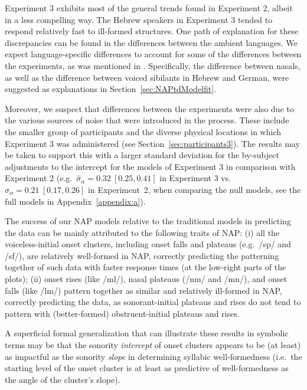 Experiment 3 exhibits most of the general trends found in Experiment 2, albeit in a less compelling way. 
The Hebrew speakers in Experiment 3 tended to respond relatively fast to ill-formed structures.
One path of explanation for these discrepancies can be found in the differences between the ambient languages. We expect language-specific differences to account for some of the differences between the experiments, as was mentioned in . Specifically, the difference between nasals, as well as the difference between voiced sibilants in Hebrew and German, were suggested as explanations in Section~\ref{sec:NAPtdModelfit}.

Moreover, we suspect that differences between the experiments were also due to the various sources of noise that were introduced in the process. These include the smaller group of participants and the diverse physical locations in which Experiment 3 was administered (see Section~\ref{sec:participants3}).
The results may be taken to support this with a larger standard deviation for the by-subject adjustments to the intercept for the models of Experiment 3 in comparison with Experiment 2 (e.g.~\(\hat\sigma_\alpha = 0.32~[0.25, 0.41]\) in Experiment 3 vs.~\(\hat\sigma_\alpha = 0.21~[0.17, 0.26]\) in Experiment~2, when comparing the null models, see the full models in Appendix~\ref{appendix:a}).


The success of our NAP models relative to the traditional models in predicting the data can be mainly attributed to the following traits of NAP:
(i) all the voiceless-initial onset clusters, including onset falls and plateaus (e.g.~/sp/ and /sf/), are relatively well-formed in NAP, correctly predicting the patterning together of such data with faster response times (at the low-right parts of the plots);
(ii) onset rises (like /ml/), nasal plateaus (/nm/ and /mn/), and onset falls (like /lm/) pattern together as similar and relatively ill-formed in NAP, correctly predicting the data, as sonorant-initial plateaus and rises do not tend to pattern with (better-formed) obstruent-initial plateaus and rises.

A superficial formal generalization that can illustrate these results in symbolic terms may be that the sonority \emph{intercept} of onset clusters appears to be (at least) as impactful as the sonority \emph{slope} in determining syllabic well-formed\-ness (i.e.~the starting level of the onset cluster is at least as predictive of well-formedness as the angle of the cluster's slope).
